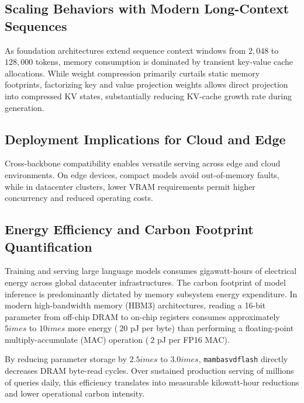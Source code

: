 \subsection{Scaling Behaviors with Modern Long-Context Sequences}
As foundation architectures extend sequence context windows from $2{,}048$ to $128{,}000$ tokens, memory consumption is dominated by transient key-value cache allocations. While weight compression primarily curtails static memory footprints, factorizing key and value projection weights allows direct projection into compressed KV states, substantially reducing KV-cache growth rate during generation.

\subsection{Deployment Implications for Cloud and Edge}
Cross-backbone compatibility enables versatile serving across edge and cloud environments. On edge devices, compact models avoid out-of-memory faults, while in datacenter clusters, lower VRAM requirements permit higher concurrency and reduced operating costs.

\subsection{Energy Efficiency and Carbon Footprint Quantification}
Training and serving large language models consumes gigawatt-hours of electrical energy across global datacenter infrastructures. The carbon footprint of model inference is predominantly dictated by memory subsystem energy expenditure. In modern high-bandwidth memory (HBM3) architectures, reading a 16-bit parameter from off-chip DRAM to on-chip registers consumes approximately $5	imes$ to $10	imes$ more energy ($~20$ pJ per byte) than performing a floating-point multiply-accumulate (MAC) operation ($~2$ pJ per FP16 MAC).

By reducing parameter storage by $2.5	imes$ to $3.0	imes$, \texttt{mambasvdflash} directly decreases DRAM byte-read cycles. Over sustained production serving of millions of queries daily, this efficiency translates into measurable kilowatt-hour reductions and lower operational carbon intensity.
